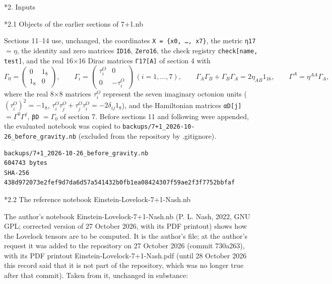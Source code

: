 \documentclass[10pt,a4paper]{article}
\makeatletter
\renewcommand\section{\@startsection{section}{1}{\z@}{-3.5ex \@plus -1ex \@minus -.2ex}{2.3ex \@plus.2ex}{\normalfont\Large\bfseries\raggedright}}
\renewcommand\subsection{\@startsection{subsection}{2}{\z@}{-3.25ex\@plus -1ex \@minus -.2ex}{1.5ex \@plus .2ex}{\normalfont\large\bfseries\raggedright}}
\makeatother
\begin{document}
\section*{2. Inputs}
\subsection*{2.1 Objects of the earlier sections of 7+1.nb}
Sections 11–14 use, unchanged, the coordinates \texttt{X = \{x0, …, x7\}}, the metric \texttt{η17} $=\eta$, the identity and zero matrices \texttt{ID16}, \texttt{Zero16}, the check registry \texttt{check[name, test]}, and the real 16×16 Dirac matrices \texttt{Γ17[A]} of section 4 with
\begin{equation*}
\Gamma_0=\begin{pmatrix}0&1_8\\1_8&0\end{pmatrix},\qquad \Gamma_i=\begin{pmatrix}\tau^O_i&0\\0&-\tau^O_i\end{pmatrix}\ (i=1,\dots,7),\qquad \Gamma_A\Gamma_B+\Gamma_B\Gamma_A=2\eta_{AB}1_{16},\qquad \Gamma^A=\eta^{AA}\Gamma_A,
\end{equation*}
where the real 8×8 matrices $\tau^O_i$ represent the seven imaginary octonion units ($(\tau^O_i)^2=-1_8$, $\tau^O_i\tau^O_j+\tau^O_j\tau^O_i=-2\delta_{ij}1_8$), and the Hamiltonian matrices \texttt{αD[j]} $=\Gamma^0\Gamma^j$, \texttt{βD} $=\Gamma_0$ of section 7. Before sections 11 and following were appended, the evaluated notebook was copied to \texttt{backups/\allowbreak{}7+1\_\allowbreak{}2026-10-26\_\allowbreak{}before\_\allowbreak{}gravity.nb} (excluded from the repository by .gitignore).

\begin{Verbatim}[fontsize=\small,frame=single,framesep=2mm]
backups/7+1_2026-10-26_before_gravity.nb
604743 bytes
SHA-256 438d972073e2fef9d7da6d57a541432b0fb1ea08424307f59ae2f3f7752bbfaf
\end{Verbatim}
\subsection*{2.2 The reference notebook Einstein-Lovelock-7+1-Nash.nb}
The author’s notebook Einstein-Lovelock-7+1-Nash.nb (P. L. Nash, 2022, GNU GPL; corrected version of 27 October 2026, with its PDF printout) shows how the Lovelock tensors are to be computed. It is the author’s file; at the author’s request it was added to the repository on 27 October 2026 (commit 730a263), with its PDF printout Einstein-Lovelock-7+1-Nash.pdf (until 28 October 2026 this record said that it is not part of the repository, which was no longer true after that commit). Taken from it, unchanged in substance:
\end{document}
